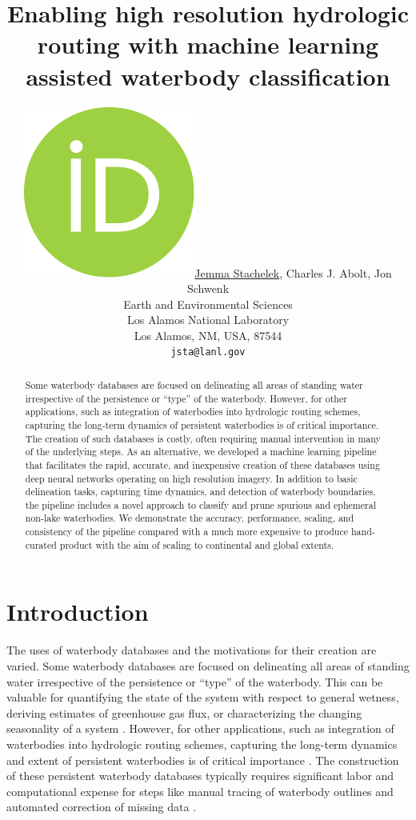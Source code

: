 \documentclass{article}
\title{Enabling high resolution hydrologic routing with machine learning assisted waterbody classification}
\date{} 					%
\author{ \href{https://orcid.org/0000-0002-5924-2464}{\includegraphics[scale=0.06]{orcid.pdf}\hspace{1mm}Jemma Stachelek}, Charles J. Abolt, Jon Schwenk \\
	Earth and Environmental Sciences\\
	Los Alamos National Laboratory\\
	Los Alamos, NM, USA, 87544 \\
	\texttt{jsta@lanl.gov} \\
}
\begin{document}
\maketitle

\begin{abstract}	
	Some waterbody databases are focused on delineating all areas of standing water irrespective of the persistence or “type” of the waterbody. However, for other applications, such as integration of waterbodies into hydrologic routing schemes, capturing the long-term dynamics of persistent waterbodies is of critical importance. The creation of such databases is costly, often requiring manual intervention in many of the underlying steps. As an alternative, we developed a machine learning pipeline that facilitates the rapid, accurate, and inexpensive creation of these databases using deep neural networks operating on high resolution imagery. In addition to basic delineation tasks, capturing time dynamics, and detection of waterbody boundaries, the pipeline includes a novel approach to classify and prune spurious and ephemeral non-lake waterbodies. We demonstrate the accuracy, performance, scaling, and consistency of the pipeline compared with a much more expensive to produce hand-curated product with the aim of scaling to continental and global extents.
\end{abstract}


\section{Introduction}
The uses of waterbody databases and the motivations for their creation are varied. Some waterbody databases are focused on delineating all areas of standing water irrespective of the persistence or “type” of the waterbody. This can be valuable for quantifying the state of the system with respect to general wetness, deriving estimates of greenhouse gas flux, or  characterizing the changing seasonality of a system \citep{cooleyArcticBorealLake2019, mullenUsingHighResolution2023}. However, for other applications, such as integration of waterbodies into hydrologic routing schemes, capturing the long-term dynamics and extent of persistent waterbodies is of critical importance \citep{davidDecadeRAPIDReflections2016,mizukamiVectorBasedRiver2021}. The construction of these persistent waterbody databases typically requires significant labor and computational expense for steps like manual tracing of waterbody outlines and automated correction of missing data \citep{amatulliHydrography90mNewHighresolution2022,lehnerGlobalRiverHydrography2013}.
\end{document}

